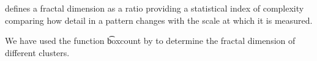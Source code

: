 \textcite{} defines a fractal dimension as a ratio providing a statistical index of complexity comparing how detail in a pattern changes with the scale at which it is measured. 


We have used the function \t{boxcount} by \textcite{boxCounting} to determine the fractal dimension of different clusters. 




